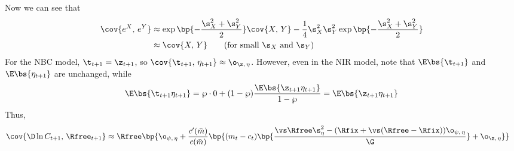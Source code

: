 Now we can see that
\begin{align*}
    \cov{e^X,\,e^Y} &\approx \exp\bp{-\frac{\s_X^2 + \s_Y^2}{2}}\cov{X,\,Y} - \frac{1}{4}{\s_X^2\s_Y^2}\exp\bp{-\frac{\s_X^2 + \s_Y^2}{2}}\\
    &\approx \cov{X,\,Y} \tag{for small $\s_X$ and $\s_Y$}
\end{align*}
For the NBC model, $\t_{t+1} = \z_{t+1}$, so $\cov{\t_{t+1},\,\eta_{t+1}} \approx \o_{\z,\,\eta}$. However, even in the NIR model, note that $\E\bs{\t_{t+1}}$ and $\E\bs{\eta_{t+1}}$ are unchanged, while
\[
\E\bs{\t_{t+1}\eta_{t+1}} = \wp\cdot 0 + (1-\wp)\frac{\E\bs{\z_{t+1}\eta_{t+1}}}{1-\wp} = \E\bs{\z_{t+1}\eta_{t+1}}
\]
Thus,
\begin{align*}
    \cov{\D\ln C_{t+1},\,\Rfree_{t+1}} &\approx \Rfree\bp{\o_{\psi,\,\eta} + \frac{c'(\bar{m})}{c(\bar{m})}\bp{(m_t - c_t)\bp{\frac{\vs\Rfree\s_{\eta}^2 - (\Rfix + \vs(\Rfree - \Rfix))\o_{\psi,\,\eta}}{\G}} + \o_{\z,\,\eta}}}
\end{align*}